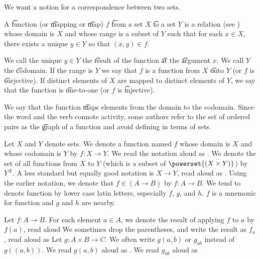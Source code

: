 

We want a notion for a correspondence between two sets.


A \t{function}
(or \t{mapping} or \t{map}) $f$ \t{from} a set $X$ \t{to} a set $Y$ is a relation (see ) whose domain is $X$ and whose range is a subset of $Y$ such that for each $x \in X$, there exists a unique $y \in Y$ so that $(x, y) \in f$.

We call the unique $y \in Y$ the \t{result} of the function \t{at} the \t{argument} $x$.
We call $Y$ the \t{codomain}.
If the range is $Y$ we say that $f$ is a function from $X$ \t{onto} $Y$ (or $f$ is \t{surjective}).
If distinct elements of $X$ are mapped to distinct elements of $Y$, we say that the function is \t{one-to-one} (or $f$ is \t{injective}).

We say that the function \t{maps} elements from the domain to the codomain.
Since the word  and the verb  connote activity, some authors refer to the set of ordered pairs as the \t{graph} of a function and avoid defining  in terms of sets.


Let $X$ and $Y$ denote sets.
We denote a function named $f$ whose domain is $X$ and whose codomain is $Y$ by $f: X \to Y$.
We read the notation aloud as .
We denote the set of all functions from $X$ to $Y$ (which is a subset of $\powerset{(X \times Y)}$) by $Y^{X}$.
A less standard but equally good notation is $X \to Y$, read aloud as .
Using the earlier notation, we denote that $f \in (A \to B)$ by $f: A \to B$.
We tend to denote function by lower case latin letters, especially $f$, $g$, and $h$.
$f$ is a mnemonic for function and $g$ and $h$ are nearby.

Let $f: A \to B$.
For each element $a \in A$, we denote the result of applying $f$ to $a$ by $f(a)$, read aloud 
We sometimes drop the parentheses, and write the result as $f_a$, read aloud as 
Let $g: A \times B \to C$.
We often write $g(a,b)$ or $g_{ab}$ instead of $g((a,b))$.
We read $g(a, b)$ aloud as .
We read $g_{ab}$ aloud as 

